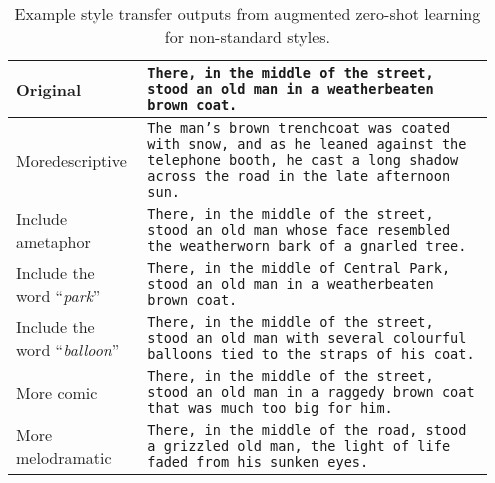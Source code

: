 \begin{table}[tbp]
\setlength{\tabcolsep}{3.3pt}
  \small
    \label{fig:visualizer_results}
    \begin{tabular}{p{0.25\linewidth}>{\scriptsize}p{0.7\linewidth}}
    \toprule
    Original & \texttt{There, in the middle of the street, stood an old man in a weatherbeaten brown coat.} \\
    \hline
    More\newline descriptive &
    \texttt{The man's brown trenchcoat was coated with snow, and as he leaned against the telephone booth, he cast a long shadow across the road in the late afternoon sun.}\\
    \hline
    Include a\newline metaphor &
    \texttt{There, in the middle of the street, stood an old man whose face resembled the weatherworn bark of a gnarled tree.}\\
    \hline
    Include the \newline word ``\textit{park}'' & \texttt{There, in the middle of Central Park, stood an old man in a weatherbeaten brown coat.} \\
    \hline
    Include the \newline word ``\textit{balloon}'' & \texttt{There, in the middle of the street, stood an old man with several colourful balloons tied to the straps of his coat.} \\
    \hline
    More comic & \texttt{There, in the middle of the street, stood an old man in a raggedy brown coat that was much too big for him.} \\
    \hline
    More melodramatic & \texttt{There, in the middle of the road, stood a grizzled old man, the light of life faded from his sunken eyes.}\\
    \bottomrule
    \end{tabular}%
    \vspace{-1mm}
    \caption{Example style transfer outputs from augmented zero-shot learning for non-standard styles. }  %
  \label{tab:style-transfer-examples}%
  \vspace{-2mm}
\end{table}%






